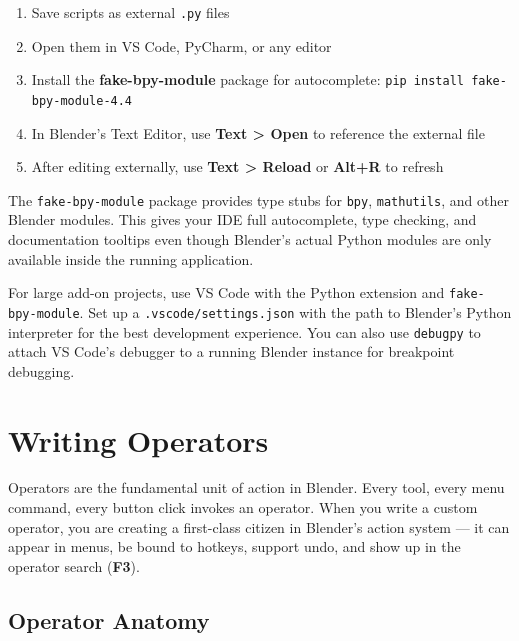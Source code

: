 \begin{enumerate}[leftmargin=2em]
  \item Save scripts as external \texttt{.py} files
  \item Open them in VS Code, PyCharm, or any editor
  \item Install the \textbf{fake-bpy-module} package for autocomplete: \texttt{pip install fake-bpy-module-4.4}
  \item In Blender's Text Editor, use \textbf{Text > Open} to reference the external file
  \item After editing externally, use \textbf{Text > Reload} or \textbf{Alt+R} to refresh
\end{enumerate}

The \texttt{fake-bpy-module} package provides type stubs for \texttt{bpy}, \texttt{mathutils}, and other Blender modules. This gives your IDE full autocomplete, type checking, and documentation tooltips even though Blender's actual Python modules are only available inside the running application.

\begin{tipbox}
For large add-on projects, use VS Code with the Python extension and \texttt{fake-bpy-module}. Set up a \texttt{.vscode/settings.json} with the path to Blender's Python interpreter for the best development experience. You can also use \texttt{debugpy} to attach VS Code's debugger to a running Blender instance for breakpoint debugging.
\end{tipbox}


\section{Writing Operators}
\label{sec:scripting-operators}

Operators are the fundamental unit of action in Blender. Every tool, every menu command, every button click invokes an operator. When you write a custom operator, you are creating a first-class citizen in Blender's action system --- it can appear in menus, be bound to hotkeys, support undo, and show up in the operator search (\textbf{F3}).

\subsection{Operator Anatomy}

